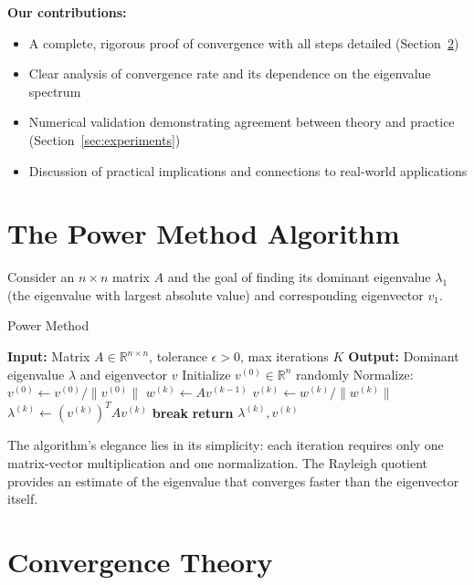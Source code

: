 \documentclass[11pt,a4paper]{article}
\begin{document}
\textbf{Our contributions:}
\begin{itemize}
    \item A complete, rigorous proof of convergence with all steps detailed (Section~\ref{sec:theory})
    \item Clear analysis of convergence rate and its dependence on the eigenvalue spectrum
    \item Numerical validation demonstrating agreement between theory and practice (Section~\ref{sec:experiments})
    \item Discussion of practical implications and connections to real-world applications
\end{itemize}

\section{The Power Method Algorithm}
\label{sec:algorithm}

Consider an $n \times n$ matrix $A$ and the goal of finding its dominant eigenvalue $\lambda_1$ (the eigenvalue with largest absolute value) and corresponding eigenvector $v_1$.

\begin{algorithm}[h]
\caption{Power Method}
\label{alg:power}
\begin{algorithmic}[1]
\State \textbf{Input:} Matrix $A \in \mathbb{R}^{n \times n}$, tolerance $\epsilon > 0$, max iterations $K$
\State \textbf{Output:} Dominant eigenvalue $\lambda$ and eigenvector $v$
\State Initialize $v^{(0)} \in \mathbb{R}^n$ randomly
\State Normalize: $v^{(0)} \leftarrow v^{(0)} / \|v^{(0)}\|$
    \State $w^{(k)} \leftarrow A v^{(k-1)}$ 
    \State $v^{(k)} \leftarrow w^{(k)} / \|w^{(k)}\|$ 
    \State $\lambda^{(k)} \leftarrow (v^{(k)})^T A v^{(k)}$ 
        \State \textbf{break}
    \EndIf
\EndFor
\State \textbf{return} $\lambda^{(k)}, v^{(k)}$
\end{algorithmic}
\end{algorithm}

The algorithm's elegance lies in its simplicity: each iteration requires only one matrix-vector multiplication and one normalization. The Rayleigh quotient provides an estimate of the eigenvalue that converges faster than the eigenvector itself.

\section{Convergence Theory}
\label{sec:theory}
\end{document}
